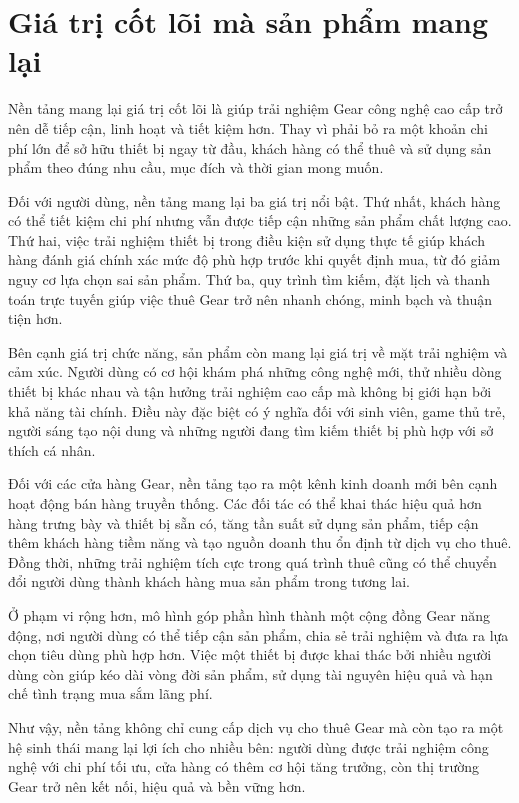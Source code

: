 \section{Giá trị cốt lõi mà sản phẩm mang lại}
    Nền tảng mang lại giá trị cốt lõi là giúp trải nghiệm Gear công nghệ cao cấp trở nên dễ tiếp cận, linh hoạt và tiết kiệm hơn. Thay vì phải bỏ ra một khoản chi phí lớn để sở hữu thiết bị ngay từ đầu, khách hàng có thể thuê và sử dụng sản phẩm theo đúng nhu cầu, mục đích và thời gian mong muốn.

    Đối với người dùng, nền tảng mang lại ba giá trị nổi bật. Thứ nhất, khách hàng có thể tiết kiệm chi phí nhưng vẫn được tiếp cận những sản phẩm chất lượng cao. Thứ hai, việc trải nghiệm thiết bị trong điều kiện sử dụng thực tế giúp khách hàng đánh giá chính xác mức độ phù hợp trước khi quyết định mua, từ đó giảm nguy cơ lựa chọn sai sản phẩm. Thứ ba, quy trình tìm kiếm, đặt lịch và thanh toán trực tuyến giúp việc thuê Gear trở nên nhanh chóng, minh bạch và thuận tiện hơn.

    Bên cạnh giá trị chức năng, sản phẩm còn mang lại giá trị về mặt trải nghiệm và cảm xúc. Người dùng có cơ hội khám phá những công nghệ mới, thử nhiều dòng thiết bị khác nhau và tận hưởng trải nghiệm cao cấp mà không bị giới hạn bởi khả năng tài chính. Điều này đặc biệt có ý nghĩa đối với sinh viên, game thủ trẻ, người sáng tạo nội dung và những người đang tìm kiếm thiết bị phù hợp với sở thích cá nhân.

    Đối với các cửa hàng Gear, nền tảng tạo ra một kênh kinh doanh mới bên cạnh hoạt động bán hàng truyền thống. Các đối tác có thể khai thác hiệu quả hơn hàng trưng bày và thiết bị sẵn có, tăng tần suất sử dụng sản phẩm, tiếp cận thêm khách hàng tiềm năng và tạo nguồn doanh thu ổn định từ dịch vụ cho thuê. Đồng thời, những trải nghiệm tích cực trong quá trình thuê cũng có thể chuyển đổi người dùng thành khách hàng mua sản phẩm trong tương lai.

    Ở phạm vi rộng hơn, mô hình góp phần hình thành một cộng đồng Gear năng động, nơi người dùng có thể tiếp cận sản phẩm, chia sẻ trải nghiệm và đưa ra lựa chọn tiêu dùng phù hợp hơn. Việc một thiết bị được khai thác bởi nhiều người dùng còn giúp kéo dài vòng đời sản phẩm, sử dụng tài nguyên hiệu quả và hạn chế tình trạng mua sắm lãng phí.

    Như vậy, nền tảng không chỉ cung cấp dịch vụ cho thuê Gear mà còn tạo ra một hệ sinh thái mang lại lợi ích cho nhiều bên: người dùng được trải nghiệm công nghệ với chi phí tối ưu, cửa hàng có thêm cơ hội tăng trưởng, còn thị trường Gear trở nên kết nối, hiệu quả và bền vững hơn.
